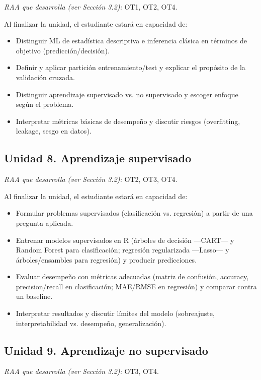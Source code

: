 \documentclass[11pt,a4paper]{article}
\begin{document}
\textit{RAA que desarrolla (ver Sección 3.2):} OT1, OT2, OT4.

Al finalizar la unidad, el estudiante estará en capacidad de:

\begin{itemize}
    \item Distinguir ML de estadística descriptiva e inferencia clásica en términos de objetivo (predicción\slash decisión).
    \item Definir y aplicar partición entrenamiento/test y explicar el propósito de la validación cruzada.
    \item Distinguir aprendizaje supervisado vs. no supervisado y escoger enfoque según el problema.
    \item Interpretar métricas básicas de desempeño y discutir riesgos (overfitting, leakage, sesgo en datos).
\end{itemize}

\subsection*{Unidad 8. Aprendizaje supervisado}

\textit{RAA que desarrolla (ver Sección 3.2):} OT2, OT3, OT4.

Al finalizar la unidad, el estudiante estará en capacidad de:

\begin{itemize}
    \item Formular problemas supervisados (clasificación vs. regresión) a partir de una pregunta aplicada.
    \item Entrenar modelos supervisados en R (árboles de decisión ---CART--- y Random Forest para clasificación; regresión regularizada ---Lasso--- y árboles/ensambles para regresión) y producir predicciones.
    \item Evaluar desempeño con métricas adecuadas (matriz de confusión, accuracy, precision/recall en clasificación; MAE/RMSE en regresión) y comparar contra un baseline.
    \item Interpretar resultados y discutir límites del modelo (sobreajuste, interpretabilidad vs. desempeño, generalización).
\end{itemize}

\subsection*{Unidad 9. Aprendizaje no supervisado}

\textit{RAA que desarrolla (ver Sección 3.2):} OT3, OT4.
\end{document}
